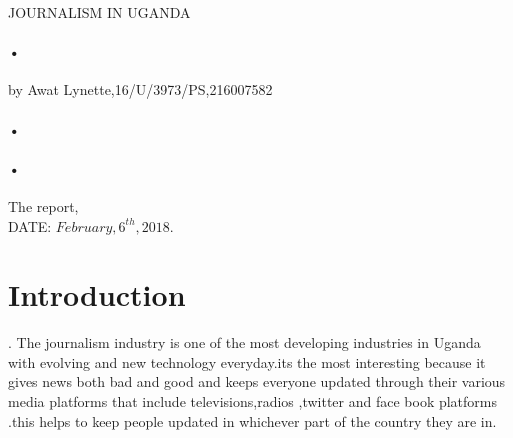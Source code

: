 \documentclass[12pt,]{article}
\begin{document}
 

\begin{titlepage}
\centerline{JOURNALISM IN UGANDA\\}
\paragraph*{•}
\centerline{by Awat Lynette,16/U/3973/PS,216007582}
\paragraph*{•}
\paragraph*{•}
\begin{flushright}
       The report,\\
       DATE: $February,6^{th},2018$.
 \tableofcontents

\date{\today}
\end{flushright}
\end{titlepage}
\newpage
\section{Introduction}.
The journalism industry is one of the most developing industries in Uganda with evolving and new technology everyday.its the most interesting because it gives news both bad and good and keeps everyone updated through their various media platforms that include televisions,radios ,twitter and face book platforms .this helps to keep people updated in whichever part of the country they are in.
\end{document}
